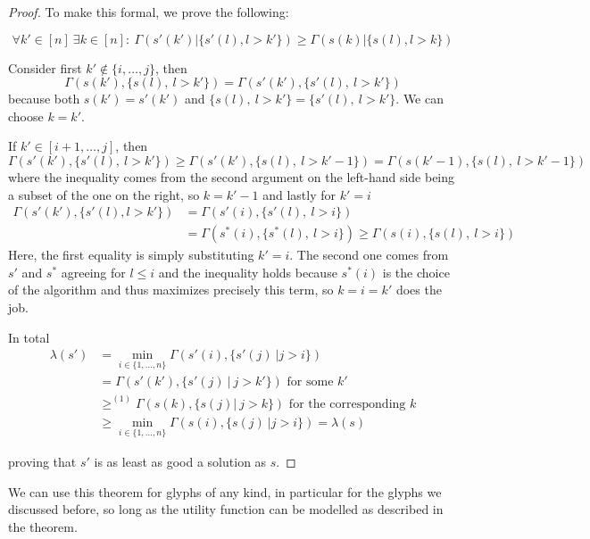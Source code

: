 \documentclass[a4paper,11pt]{article}
\begin{document}
\begin{proof}
To make this formal, we prove the following: 

\begin{equation}
    \forall k'\in[n]\ \exists k\in[n]:\ \Gamma(s'(k')|\{s'(l), l>k'\})\geq\Gamma(s(k)|\{s(l), l>k\})
\end{equation}

Consider first $k'\notin \{i,\dots,j\}$, then
\[\Gamma(s(k'),\{s(l),\ l>k'\}) = \Gamma(s'(k'),\{s'(l),\ l>k'\})\]
because both $s(k')=s'(k')$ and $\{s(l),\ l>k'\}=\{s'(l),\ l>k'\}$. We can choose $k=k'$.

If $k'\in [i+1,\dots,j]$, then
\[ \Gamma(s'(k'),\{s'(l),\ l>k'\}) \geq \Gamma(s'(k'),\{s(l),\ l>k'-1\}) = \Gamma(s(k'-1),\{s(l),\ l>k'-1\})\]
where the inequality comes from the second argument on the left-hand side being a subset of the one on the right, so $k=k'-1$ and lastly for $k'=i$
\begin{equation*}
\begin{split}
\Gamma(s'(k'),\{s'(l), l>k'\}) &= \Gamma(s'(i),\{s'(l),\ l>i\})\\
&=\Gamma(s^*(i),\{s^*(l),\ l>i\})\geq\Gamma(s(i),\{s(l),\ l>i\})
\end{split}
\end{equation*}
Here, the first equality is simply substituting $k'=i$. The second one comes from $s'$ and $s^*$ agreeing for $l\leq i$ and the inequality holds because $s^*(i)$ is the choice of the algorithm and thus maximizes precisely this term, so $k=i=k'$ does the job.

In total 
\begin{equation*}
\begin{split}
    \lambda(s') &=  \min_{i \in \{1,\dots,n\}} \Gamma(s'(i), \{s'(j)\ | j > i\})\\
    &= \Gamma(s'(k'), \{s'(j)\ |\ j > k'\}) \text{ for some }k'\\
    &\geq^{(1)} \Gamma(s(k), \{s(j)|\ j>k \}) \text{ for the corresponding }k\\
    &\geq \min_{i \in \{1,\dots,n\}} \Gamma(s(i), \{s(j)\ | j > i\}) = \lambda(s)
\end{split}
\end{equation*}

proving that $s'$ is as least as good a solution as $s$.
\end{proof}

We can use this theorem for glyphs of any kind, in particular for the glyphs we discussed before, so long as the utility function can be modelled as described in the theorem.\\
\end{document}
